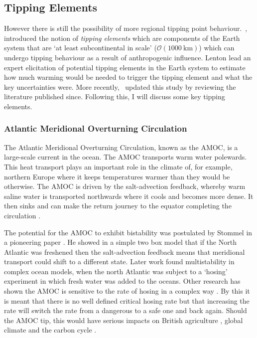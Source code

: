 \subsection{Tipping Elements}

However there is still the possibility of more regional tipping point behaviour.~\cite{Lenton2008}, introduced the notion of \emph{tipping elements} which
are components of the Earth system that are `at least subcontinental in scale' ($\mathcal{O}(\SI{1000}{\kilo\meter})$) which can undergo tipping behaviour as a result of
anthropogenic influence. Lenton lead an expert elicitation of potential tipping elements in the Earth system to estimate how much warming would be needed to trigger the tipping element
and what the key uncertainties were. More recently,~\cite{ArmstrongMcKay2022} updated this study by reviewing the literature published since.  Following this, I will discuss some key tipping elements.

\subsubsection{Atlantic Meridional Overturning Circulation}
The Atlantic Meridional Overturning Circulation, known as the AMOC, is a large-scale current in the ocean. The AMOC transports warm water polewards. This heat transport plays an
important role in the climate of, for example, northern Europe where it keeps temperatures warmer than they would be otherwise. The AMOC is driven by the salt-advection feedback, whereby
warm saline water is transported northwards where it cools and becomes more dense.  It then sinks and can make the return journey to the equator completing the circulation  \parencite{Dijkstra2011}.

The potential for the AMOC to exhibit bistability was postulated by Stommel in a pioneering paper \parencite{STOMMEL1961}. He showed in a simple two box model that if the North Atlantic was
freshened then the salt-advection feedback means that meridional transport could shift to a different state. Later work \parencite{Rahmstorf1995,Hawkins2011} found multistability in
complex ocean models, when the north Atlantic was subject to a `hosing' experiment in which fresh water was added to the oceans. Other research has shown the AMOC is sensitive to the
rate of hosing \parencite{Alkhayuon2019} in a complex way \parencite{Lohmann2021}. By this it is meant that there is no well defined critical
hosing rate but that increasing the rate will switch the rate from a dangerous to a safe one and back again. Should the AMOC tip, this would have serious impacts on British agriculture
\parencite{Ritchie2020a}, global climate \parencite{Jackson2015} and the carbon cycle \parencite{Bozbiyik2011}.


